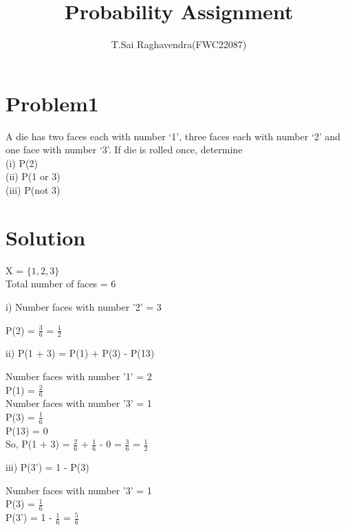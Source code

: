\documentclass[journal,12pt,twocolumn]{IEEEtran}
\title{\mytitle}
\title{
Probability Assignment
}
\author{T.Sai Raghavendra(FWC22087)}
\begin{document}
\maketitle
\tableofcontents
\bigskip


\section{\textbf{Problem1}}
A die has two faces each with number ‘1’, three faces each with number ‘2’ and
one face with number ‘3’. If die is rolled once, determine\\
(i) P(2) \\(ii) P(1 or 3) \\(iii) P(not 3)\\
\section{\textbf{Solution}}
X = $\{1,2,3\}$\\
Total number of faces = 6

i) Number faces with number '2' = 3
\begin{center}
	P(2) = $\frac{3}{6}$ = $\frac{1}{2}$
\end{center}
	
ii) P(1 + 3) = P(1) + P(3) - P(13)
\begin{center}
	Number faces with number '1' = 2\\
	P(1) = $\frac{2}{6}$\\
	Number faces with number '3' = 1\\
	P(3) = $\frac{1}{6}$\\
	P(13) = 0\\
	So, P(1 + 3) = $\frac{2}{6}$ + $\frac{1}{6}$ - 0 = $\frac{3}{6}$ = $\frac{1}{2}$
\end{center}
	
iii) P(3') = 1 - P(3)
\begin{center}
	Number faces with number '3' = 1\\
	P(3) = $\frac{1}{6}$\\ 
	P(3') = 1 - $\frac{1}{6}$ = $\frac{5}{6}$
\end{center}
\end{document}
